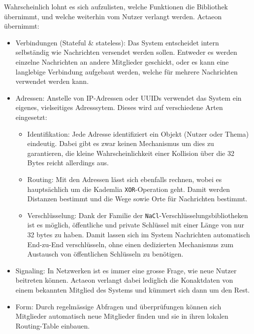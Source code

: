 \documentclass[11pt]{article}
\begin{document}
\noindent Wahrscheinlich lohnt es sich aufzulisten, welche Funktionen
die Bibliothek übernimmt, und welche weiterhin vom Nutzer verlangt
werden. Actaeon übernimmt:
\begin{itemize}
\item Verbindungen (Stateful \& stateless): Das System entscheidet intern
selbständig wie Nachrichten versendet werden sollen. Entweder es
werden einzelne Nachrichten an andere Mitglieder geschickt, oder es
kann eine langlebige Verbindung aufgebaut werden, welche für mehrere
Nachrichten verwendet werden kann.
\item Adressen: Anstelle von IP-Adressen oder UUIDs verwendet das System
ein eigenes, vielseitiges Adresssytem. Dieses wird auf verschiedene
Arten eingesetzt:
\begin{itemize}
\item Identifikation: Jede Adresse identifiziert ein Objekt (Nutzer oder
Thema) eindeutig. Dabei gibt es zwar keinen Mechanismus um dies zu
garantieren, die kleine Wahrscheinlichkeit einer Kollision über
die 32 Bytes reicht allerdings aus.
\item Routing: Mit den Adressen lässt sich ebenfalls rechnen, wobei es
hauptsächlich um die Kademlia \texttt{XOR}-Operation geht. Damit werden
Distanzen bestimmt und die Wege sowie Orte für Nachrichten
bestimmt.
\item Verschlüsselung: Dank der Familie der
\texttt{NaCl}-Verschlüsselungsbibliotheken ist es möglich, öffentliche und
private Schlüssel mit einer Länge von nur 32 bytes zu haben. Damit
lassen sich im System Nachrichten automatisch End-zu-End
verschlüsseln, ohne einen dedizierten Mechanismus zum Austausch
von öffentlichen Schlüsseln zu benötigen.
\end{itemize}
\item Signaling: In Netzwerken ist es immer eine grosse Frage, wie neue
Nutzer beitreten können. Actaeon verlangt dabei lediglich die
Konaktdaten von einem bekannten Mitglied des Systems und kümmert
sich dann um den Rest.
\item Form: Durch regelmässige Abfragen und überprüfungen können sich
Mitglieder automatisch neue Mitglieder finden und sie in ihren
lokalen Routing-Table einbauen.
\end{itemize}
\end{document}
